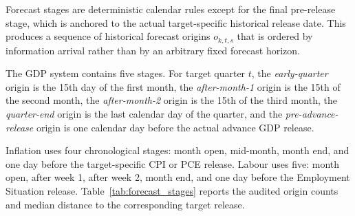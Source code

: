Forecast stages are deterministic calendar rules except for the final
pre-release stage, which is anchored to the actual target-specific historical
release date. This produces a sequence of historical forecast origins
$o_{k,t,s}$ that is ordered by information arrival rather than by an arbitrary
fixed forecast horizon.

The GDP system contains five stages. For target quarter $t$, the
\emph{early-quarter} origin is the 15th day of the first month, the
\emph{after-month-1} origin is the 15th of the second month, the
\emph{after-month-2} origin is the 15th of the third month, the
\emph{quarter-end} origin is the last calendar day of the quarter, and the
\emph{pre-advance-release} origin is one calendar day before the actual
advance GDP release.

Inflation uses four chronological stages: month open, mid-month, month end,
and one day before the target-specific CPI or PCE release. Labour uses five:
month open, after week 1, after week 2, month end, and one day before the
Employment Situation release. Table~\ref{tab:forecast_stages} reports the
audited origin counts and median distance to the corresponding target release.

